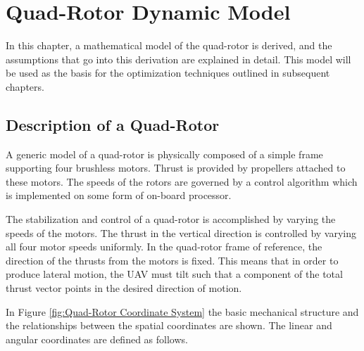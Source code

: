 
\chapter{Quad-Rotor Dynamic Model} %

\label{Chapter3} %



In this chapter, a mathematical model of the quad-rotor is derived, and the assumptions that go into this derivation are explained in detail. This model will be used as the basis for the optimization techniques outlined in subsequent chapters.

\section{Description of a Quad-Rotor}

A generic model of a quad-rotor is physically composed of a simple frame supporting four brushless motors. Thrust is provided by propellers attached to these motors. The speeds of the rotors are governed by a control algorithm which is implemented on some form of on-board processor.

 The stabilization and control of a quad-rotor is accomplished by varying the speeds of the motors. The thrust in the vertical direction is controlled by varying all four motor speeds uniformly. In the quad-rotor frame of reference, the direction of the thrusts from the motors is fixed. This means that in order to produce lateral motion, the UAV must tilt such that a component of the total thrust vector points in the desired direction of motion.

 In Figure \ref{fig:Quad-Rotor Coordinate System} the basic mechanical structure and the relationships between the spatial coordinates are shown. The linear and angular coordinates are defined as follows.

